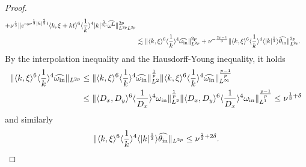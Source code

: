\documentclass[reqno, 12pt]{amsart} %
\theoremstyle{plain} %
\theoremstyle{definition}
\theoremstyle{remark}
\numberwithin{equation}{section} %
\begin{document}
\begin{proof}
\begin{equation}
\begin{aligned}
				+ \nu^\frac13 \| e^{ c_0 \nu^\frac13 |k|^\frac23 t}    \langle k, \xi + kt\rangle^6 \langle \frac{1}{k}\rangle^4 |k|^\frac{1}{3p} \widehat{\omega^{\mathrm{L}}} \|_{L^{2p} L^{2p}}^{2p} \\
				&\lesssim \|  \langle k, \xi\rangle^6 \langle \frac{1}{k}\rangle^4  \widehat{\omega_{\rm in}} \|_{L^{2p}}^{2p}  + \nu^{-\frac{2p-1}{3}} \|  \langle k, \xi\rangle^6 \langle \frac{1}{k}\rangle^4 \langle |k|^\frac13 \rangle \widehat{\theta_{\rm in}} \|_{L^{2p}}^{2p}.
		\end{aligned}\end{equation}
		By the interpolation inequality and the Hausdorff-Young inequality, it holds 
		\begin{equation}\begin{aligned} \label{eq:ini omega}
				\|  \langle k, \xi\rangle^6 \langle \frac{1}{k}\rangle^4  \widehat{\omega_{\rm in}} \|_{L^{2p}} &\leq  \|  \langle k, \xi\rangle^6 \langle \frac{1}{k}\rangle^4  \widehat{\omega_{\rm in}} \|_{L^{2}}^\frac1p \|  \langle k, \xi\rangle^6 \langle \frac{1}{k}\rangle^4  \widehat{\omega_{\rm in}} \|_{L^{\infty}}^\frac{p-1}{p} \\
				& \leq  \|  \langle D_x, D_y\rangle^6 \langle \frac{1}{D_x}\rangle^4 \omega_{\rm in} \|_{L^2}^\frac1p \|  \langle D_x, D_y\rangle^6 \langle \frac{1}{D_x}\rangle^4 \omega_{\rm in} \|_{L^1}^\frac{p-1}{p} \leq \nu^{\frac13 + \delta}
		\end{aligned}\end{equation}
		and similarly
		\begin{equation}\begin{aligned} \label{eq:ini theta}
				\|  \langle k, \xi\rangle^6 \langle \frac{1}{k}\rangle^4 \langle |k|^\frac13 \rangle  \widehat{\theta_{\rm in}} \|_{L^{2p}} \leq \nu^{\frac23 + 2\delta}.
		\end{aligned}\end{equation}

\end{proof}
\end{document}
